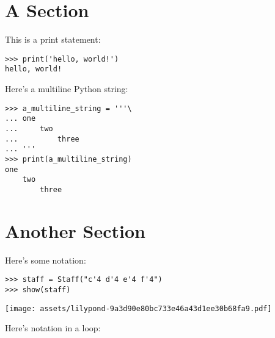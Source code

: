 \documentclass{article}
\begin{document}
\section{A Section}

This is a print statement:

\begin{comment}
<abjad>
print('hello, world!')
</abjad>
\end{comment}

\begin{singlespacing}
\begin{lstlisting}
>>> print('hello, world!')
hello, world!
\end{lstlisting}
\end{singlespacing}

Here's a multiline Python string:

\begin{comment}
<abjad>
a_multiline_string = '''\
one
    two
        three
'''
print(a_multiline_string)
</abjad>
\end{comment}

\begin{singlespacing}
\begin{lstlisting}
>>> a_multiline_string = '''\
... one
...     two
...         three
... '''
>>> print(a_multiline_string)
one
    two
        three
\end{lstlisting}
\end{singlespacing}

\section{Another Section}

Here's some notation:

\begin{comment}
<abjad>
staff = Staff("c'4 d'4 e'4 f'4")
show(staff)
</abjad>
\end{comment}

\begin{singlespacing}
\begin{lstlisting}
>>> staff = Staff("c'4 d'4 e'4 f'4")
>>> show(staff)
\end{lstlisting}
\noindent\texttt{[image: assets/lilypond-9a3d90e80bc733e46a43d1ee30b68fa9.pdf]}
\end{singlespacing}

Here's notation in a loop:
\end{document}
